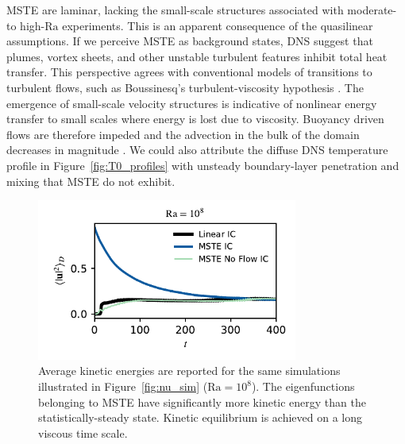\documentclass[reprint,amsmath,amssymb,aps,nofootinbib]{revtex4-1}
\newcommand\Ra{\mathrm{Ra}}
\begin{document}
MSTE are laminar, lacking the small-scale structures associated with moderate- to high-$\Ra$ experiments. 
This is an apparent consequence of the quasilinear assumptions. 
If we perceive MSTE as background states, DNS suggest that plumes, vortex sheets, and other unstable turbulent features inhibit total heat transfer. 
This perspective agrees with conventional models of transitions to turbulent flows, such as Boussinesq's turbulent-viscosity hypothesis \cite{boussinesq_1877}. 
The emergence of small-scale velocity structures is indicative of nonlinear energy transfer to small scales where energy is lost due to viscosity. 
Buoyancy driven flows are therefore impeded and the advection in the bulk of the domain decreases in magnitude \cite{drazin_reid_2004, pope_2000}. 
We could also attribute the diffuse DNS temperature profile in Figure~\ref{fig:T0_profiles} with unsteady boundary-layer penetration and mixing that MSTE do not exhibit.

\begin{figure}
    \centering
    \includegraphics[width=3.375in]{sim_eq_ke_noflow.pdf}
    \caption{Average kinetic energies are reported for the same simulations illustrated in Figure~\ref{fig:nu_sim} ($\Ra = 10^8$). 
    The eigenfunctions belonging to MSTE have significantly more kinetic energy than the statistically-steady state. 
    Kinetic equilibrium is achieved on a long viscous time scale.}
    \label{fig:ke_sim}
\end{figure}
\end{document}
